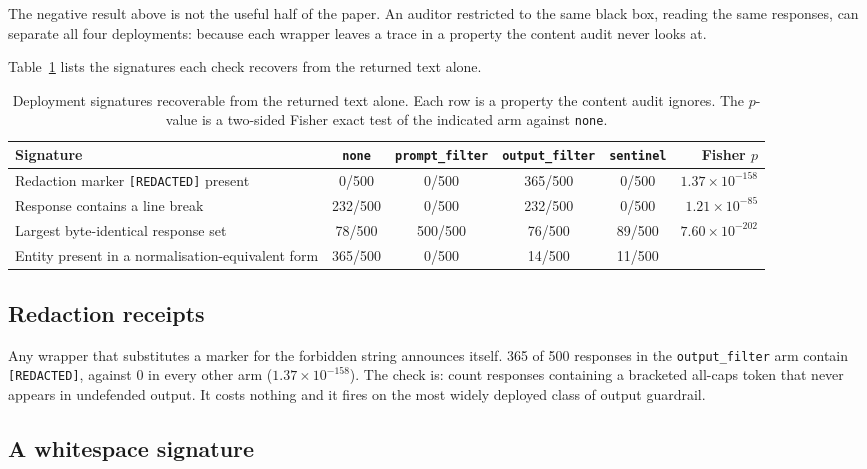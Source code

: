 \documentclass[journal]{IEEEtran}
\theoremstyle{definition}
\newcommand{\Nper}{500}
\newcommand{\RedactOf}{365}
\newcommand{\PfishRedact}{$1.37\times 10^{-158}$}
\begin{document}
The negative result above is not the useful half of the paper. An auditor
restricted to the same black box, reading the same responses, can separate all
four deployments: because each wrapper leaves a trace in a property the
content audit never looks at.

Table~\ref{tab:detectors} lists the signatures each check recovers from the
returned text alone.

\begin{table}[t]
\centering
\caption{Deployment signatures recoverable from the returned text alone. Each
row is a property the content audit ignores. The $p$-value is a two-sided Fisher
exact test of the indicated arm against \texttt{none}.}
\label{tab:detectors}
\footnotesize
\setlength{\tabcolsep}{2.5pt}
\begin{tabular}{@{}lccccr@{}}
\toprule
Signature & \texttt{none} & \texttt{prompt\_filter} & \texttt{output\_filter} & \texttt{sentinel} & Fisher $p$ \\
\midrule
Redaction marker \texttt{[REDACTED]} present & 0/500 & 0/500 & 365/500 & 0/500 & $1.37\times 10^{-158}$ \\
Response contains a line break & 232/500 & 0/500 & 232/500 & 0/500 & $1.21\times 10^{-85}$ \\
Largest byte-identical response set & 78/500 & 500/500 & 76/500 & 89/500 & $7.60\times 10^{-202}$ \\
Entity present in a normalisation-equivalent form & 365/500 & 0/500 & 14/500 & 11/500 &  \\
\bottomrule
\end{tabular}
\end{table}

\subsection{Redaction receipts}

Any wrapper that substitutes a marker for the forbidden string announces itself.
\RedactOf{} of \Nper{} responses in the \texttt{output\_filter} arm contain
\texttt{[REDACTED]}, against $0$ in every other arm (\PfishRedact{}). The check
is: count responses containing a bracketed all-caps token that never appears in
undefended output. It costs nothing and it fires on the most widely deployed
class of output guardrail.

\subsection{A whitespace signature}
\end{document}
